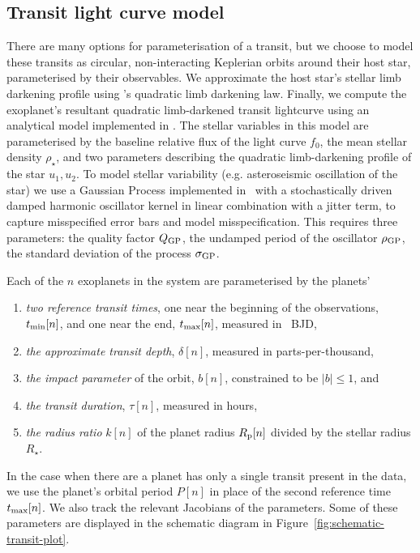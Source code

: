 \documentclass[linenumbers,floatfix,ApJL,twocolumn]{aastex631}
\begin{document}

\subsection{Transit light curve model}

There are many options for parameterisation of a transit, but we choose to model these transits as circular, non-interacting Keplerian orbits around their host star, parameterised by their observables.
We approximate the host star's stellar limb darkening profile using \citet{Kipping:2013:MNRAS}'s quadratic limb darkening law.
Finally, we compute the exoplanet's resultant quadratic limb-darkened transit lightcurve using an analytical model implemented in \starry.
The stellar variables in this model are parameterised by
the baseline relative flux of the light curve $f_0$,
the mean stellar density $\rho_\star$,
and two parameters describing the quadratic limb-darkening profile of the
star $u_1, u_2$.
To model stellar variability (e.g. asteroseismic oscillation of the star)  we use a Gaussian Process implemented in \celerite\ with a stochastically driven damped harmonic oscillator kernel in linear combination with a jitter term, to capture misspecified error bars and model misspecification. This requires three parameters: the quality factor $Q_{\rm GP}$, the undamped period of the oscillator $\rho_{\rm GP}$, the standard deviation of the process $\sigma_{\rm GP}$.

Each of the $n$ exoplanets in the system are parameterised by the planets'
\begin{enumerate}
  \item \emph{two reference transit times}, one near the beginning of the observations, $t_{\rm min}[n]$, and one near the end, $t_{\rm max}[n]$, measured in \tess\ BJD,
  \item \emph{the approximate transit depth}, $\delta[n]$, measured in parts-per-thousand,
  \item \emph{the impact parameter} of the orbit, $b[n]$, constrained to be $|b| \le 1$, and
  \item \emph{the transit duration}, $\tau[n]$, measured in hours,
  \item \emph{the radius ratio} $k[n]$ of the planet radius $R_{\rm p}[n]$ divided by the stellar radius $R_\star$.
\end{enumerate}
In the case when there are a planet has only a single transit present in the data, we use the planet's orbital period $P[n]$ in place of the second reference time $t_{\rm max}[n]$.
We also track the relevant Jacobians of the parameters. Some of these parameters are displayed in the schematic diagram in Figure~\ref{fig:schematic-transit-plot}.
\end{document}
